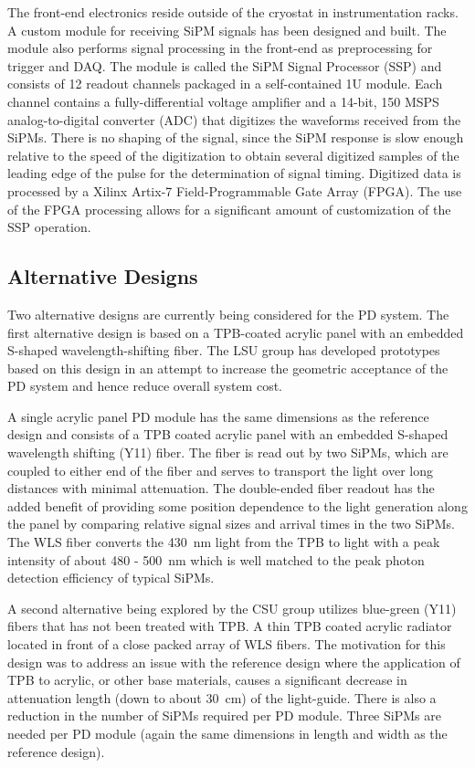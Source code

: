 The front-end electronics reside outside of the cryostat in
instrumentation racks. A custom module for receiving SiPM signals has
been designed and built. The module also performs signal processing in
the front-end as preprocessing for trigger and DAQ.  The module is
called the SiPM Signal Processor (SSP) and consists of 12 readout
channels packaged in a self-contained 1U module.  Each channel
contains a fully-differential voltage amplifier and a 14-bit, 150 MSPS
analog-to-digital converter (ADC) that digitizes the waveforms
received from the SiPMs. There is no shaping of the signal, since the
SiPM response is slow enough relative to the speed of the digitization
to obtain several digitized samples of the leading edge of the pulse
for the determination of signal timing. Digitized data is processed by
a Xilinx Artix-7 Field-Programmable Gate Array (FPGA).  The use of the
FPGA processing allows for a significant amount of customization of
the SSP operation. 

\subsection{Alternative Designs} 

Two alternative designs are currently being considered for the PD
system. The first alternative design is based on a TPB-coated acrylic
panel with an embedded S-shaped wavelength-shifting fiber. The LSU
group has developed prototypes based on this design in an attempt to
increase the geometric acceptance of the PD system and hence reduce
overall system cost. 

A single acrylic panel PD module has the same dimensions as the
reference design and consists of a TPB coated acrylic panel with an
embedded S-shaped wavelength shifting (Y11) fiber. The fiber is read
out by two SiPMs, which are coupled to either end of the fiber and
serves to transport the light over long distances with minimal
attenuation. The double-ended fiber readout has the added benefit of
providing some position dependence to the light generation along the
panel by comparing relative signal sizes and arrival times in the two
SiPMs. The WLS fiber converts the 430~nm light from the TPB to light
with a peak intensity of about 480 - 500~nm which is well matched to
the peak photon detection efficiency of typical SiPMs.

A second alternative being explored by the CSU group utilizes
blue-green (Y11) fibers that has not been treated with TPB. A thin TPB
coated acrylic radiator located in front of a close packed array of
WLS fibers. The motivation for this design was to address an issue
with the reference design where the application of TPB to acrylic, or
other base materials, causes a significant decrease in attenuation
length (down to about 30~cm) of the light-guide. There is also a
reduction in the number of SiPMs required per PD module. Three SiPMs
are needed per PD module (again the same dimensions in length and
width as the reference design). 

